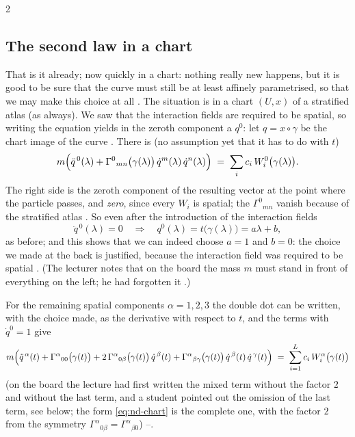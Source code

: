 \begin{paracol}{2}
\subsection{The second law in a chart}\label{ssec:nd-chart}

That is it already; now quickly in a chart: nothing really new happens, but it is good to be sure that the curve must still be at least affinely parametrised, so that we may make this choice at all . The situation is in a chart $(U,x)$ of a stratified atlas (as always). We saw that the interaction fields are required to be spatial, so
writing the equation yields in the zeroth component a $q^0$: let $q=x\circ\gamma$ be the chart image of the curve . There is (no assumption yet that it has to do with $t$)
\[
  m\Bigl(\ddot q^{\,0}(\lambda)+\Gamma^0{}_{mn}\bigl(\gamma(\lambda)\bigr)\,\dot q^m(\lambda)\,\dot q^n(\lambda)\Bigr)\;=\;\sum_ic_i\,W_i^0\bigl(\gamma(\lambda)\bigr).
\]
The right side is the zeroth component of the resulting vector at the point where the particle passes, and \emph{zero}, since every $W_i$ is spatial; the $\Gamma^0{}_{mn}$ vanish because of the stratified atlas . So even after the introduction of the interaction fields
\begin{equation}\label{eq:nd-q0}
  \ddot q^{\,0}(\lambda)=0\quad\Longrightarrow\quad q^0(\lambda)=t\bigl(\gamma(\lambda)\bigr)=a\lambda+b ,
\end{equation}
as before; and this shows that we can indeed choose $a=1$ and $b=0$: the choice we made at the back is justified, because the interaction field was required to be spatial . (The lecturer notes that on the board the mass $m$ must stand in front of everything on the left; he had forgotten it .)

For the remaining spatial components $\alpha=1,2,3$ the double dot can be written, with the choice made, as the derivative with respect to $t$, and the terms with $\dot q^0=1$ give
\begin{equation}\label{eq:nd-chart}
  m\Bigl(\ddot q^{\,\alpha}(t)+\Gamma^\alpha{}_{00}\bigl(\gamma(t)\bigr)+2\,\Gamma^\alpha{}_{0\beta}\bigl(\gamma(t)\bigr)\,\dot q^{\,\beta}(t)+\Gamma^\alpha{}_{\beta\gamma}\bigl(\gamma(t)\bigr)\,\dot q^{\,\beta}(t)\,\dot q^{\,\gamma}(t)\Bigr)\;=\;\sum_{i=1}^Lc_i\,W_i^{\alpha}\bigl(\gamma(t)\bigr)
\end{equation}
(on the board the lecture had first written the mixed term without the factor $2$ and without the last term, and a student pointed out the omission of the last term, see below; the form \eqref{eq:nd-chart} is the complete one, with the factor $2$ from the symmetry $\Gamma^\alpha{}_{0\beta}=\Gamma^\alpha{}_{\beta0}$) --.


\end{paracol}
